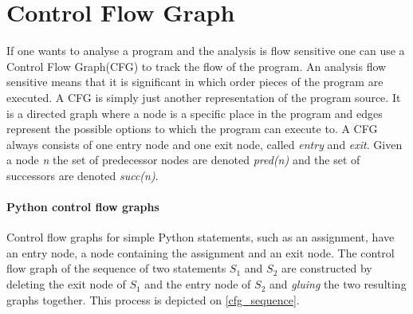 \section{Control Flow Graph}\label{control_flow_graph}
If one wants to analyse a program and the analysis is flow sensitive one can use a Control Flow Graph(CFG) to track the flow of the program.
An analysis flow sensitive means that it is significant in which order pieces of the program are executed.
A CFG is simply just another representation of the program source.
It is a directed graph where a node is a specific place in the program and edges represent the possible options to which the program can execute to.
A CFG always consists of one entry node and one exit node, called \textit{entry} and \textit{exit}.
Given a node \textit{n} the set of predecessor nodes are denoted \textit{pred(n)} and the set of successors are denoted \textit{succ(n)}.

\paragraph{Python control flow graphs}
Control flow graphs for simple Python statements, such as an assignment, have an entry node, a node containing the assignment and an exit node.
The control flow graph of the sequence of two statements $S_1$ and $S_2$ are constructed by deleting the exit node of $S_1$ and the entry node of $S_2$ and \emph{gluing} the two resulting graphs together.
This process is depicted on \cref{cfg_sequence}.

